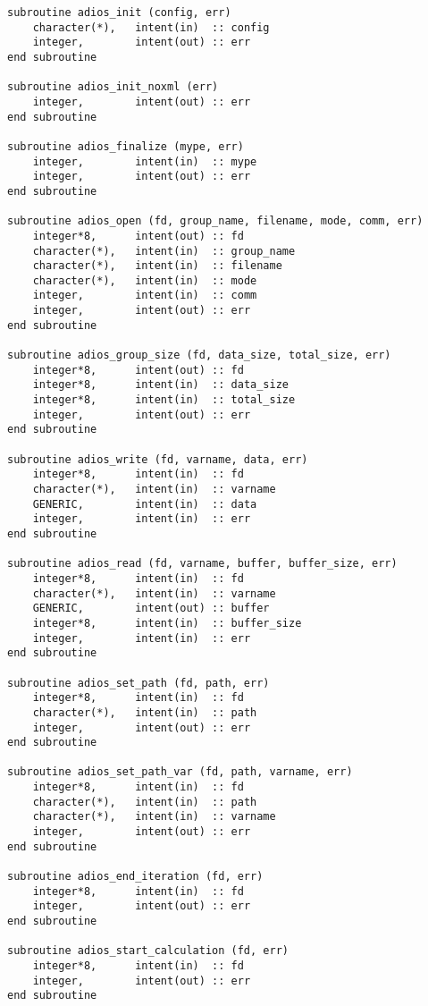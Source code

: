 \begin{lstlisting}[language=ADIOS,alsolanguage=Fortran]
subroutine adios_init (config, err)
    character(*),   intent(in)  :: config
    integer,        intent(out) :: err
end subroutine

subroutine adios_init_noxml (err)
    integer,        intent(out) :: err
end subroutine

subroutine adios_finalize (mype, err)
    integer,        intent(in)  :: mype
    integer,        intent(out) :: err
end subroutine

subroutine adios_open (fd, group_name, filename, mode, comm, err)
    integer*8,      intent(out) :: fd
    character(*),   intent(in)  :: group_name
    character(*),   intent(in)  :: filename
    character(*),   intent(in)  :: mode
    integer,        intent(in)  :: comm
    integer,        intent(out) :: err
end subroutine

subroutine adios_group_size (fd, data_size, total_size, err)
    integer*8,      intent(out) :: fd
    integer*8,      intent(in)  :: data_size
    integer*8,      intent(in)  :: total_size
    integer,        intent(out) :: err
end subroutine

subroutine adios_write (fd, varname, data, err)
    integer*8,      intent(in)  :: fd
    character(*),   intent(in)  :: varname
    GENERIC,        intent(in)  :: data
    integer,        intent(in)  :: err 
end subroutine

subroutine adios_read (fd, varname, buffer, buffer_size, err)
    integer*8,      intent(in)  :: fd
    character(*),   intent(in)  :: varname
    GENERIC,        intent(out) :: buffer
    integer*8,      intent(in)  :: buffer_size 
    integer,        intent(in)  :: err 
end subroutine

subroutine adios_set_path (fd, path, err)
    integer*8,      intent(in)  :: fd
    character(*),   intent(in)  :: path
    integer,        intent(out) :: err
end subroutine

subroutine adios_set_path_var (fd, path, varname, err)
    integer*8,      intent(in)  :: fd
    character(*),   intent(in)  :: path
    character(*),   intent(in)  :: varname
    integer,        intent(out) :: err
end subroutine

subroutine adios_end_iteration (fd, err)
    integer*8,      intent(in)  :: fd
    integer,        intent(out) :: err
end subroutine

subroutine adios_start_calculation (fd, err)
    integer*8,      intent(in)  :: fd
    integer,        intent(out) :: err
end subroutine


\end{lstlisting}
